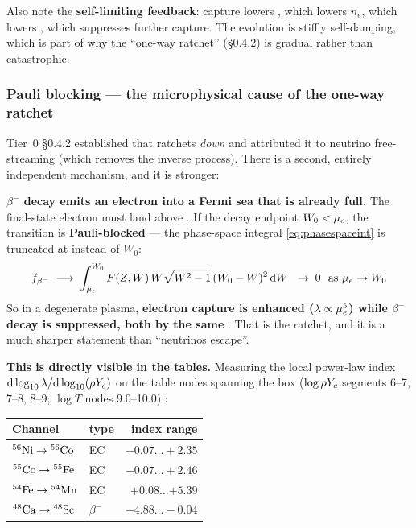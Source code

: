 Also note the \textbf{self-limiting feedback}: capture lowers \Ye, which lowers
$n_e$, which lowers \muE, which suppresses further capture. The \Ye{} evolution
is stiffly self-damping, which is part of why the ``one-way ratchet''
(\S0.4.2) is gradual rather than catastrophic.

\subsubsection{Pauli blocking --- the microphysical cause of the one-way ratchet}
\label{sec:pauli}

Tier~0 \S0.4.2 established that \Ye{} ratchets \emph{down} and attributed it to
neutrino free-streaming (which removes the inverse process). There is a second,
entirely independent mechanism, and it is stronger:

\textbf{$\beta^-$ decay emits an electron into a Fermi sea that is already
full.} The final-state electron must land above \muE. If the decay endpoint
$W_0 < \muE$, the transition is \textbf{Pauli-blocked} --- the phase-space
integral \eqref{eq:phasespaceint} is truncated at \muE{} instead of $W_0$:
%
\begin{equation*}
f_{\beta^-} \;\longrightarrow\; \int_{\muE}^{W_0}
F(Z,W)\,W\sqrt{W^2-1}\,(W_0-W)^2\,\dd W
\;\;\to\; 0 \ \text{ as } \muE \to W_0
\end{equation*}
%
So in a degenerate plasma, \textbf{electron capture is enhanced
($\lambda \propto \muE^5$) while $\beta^-$ decay is suppressed, both by the same
\muE} \citep{langanke2000,langanke2003}. That is the ratchet, and it is a much
sharper statement than ``neutrinos escape''.

\textbf{This is directly visible in the tables.} Measuring the local power-law
index $\dd\log_{10}\lambda / \dd\log_{10}(\rhoye)$ on the table nodes spanning
the box ($\log\rhoye$ segments 6--7, 7--8, 8--9; $\log T$ nodes 9.0--10.0)
\derivedhere{}:

\begin{center}
\begin{tabular}{@{}llr@{}}
\toprule
\textbf{Channel} & \textbf{type} & \textbf{index range} \\
\midrule
$\nuc{Ni}{56} \to \nuc{Co}{56}$ & EC & $+0.07 \ldots +2.35$ \\
$\nuc{Co}{55} \to \nuc{Fe}{55}$ & EC & $+0.07 \ldots +2.46$ \\
$\nuc{Fe}{54} \to \nuc{Mn}{54}$ & EC & $+0.08 \ldots \mathbf{+5.39}$ \\
$\nuc{Ca}{48} \to \nuc{Sc}{48}$ & $\beta^-$ & $\mathbf{-4.88} \ldots -0.04$ \\
\bottomrule
\end{tabular}
\end{center}

